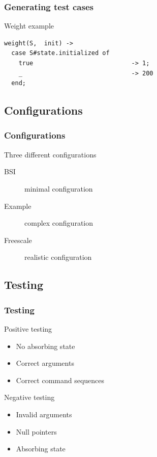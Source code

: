 \documentclass{beamer}
\begin{document}
\begin{frame}[fragile]
  \frametitle{Generating test cases}
  \begin{block}{Weight example}
    \Fontvi
    \begin{lstlisting}[style=erlang]
weight(S,  init) ->
  case S#state.initialized of
    true                           -> 1;
    _                              -> 200
  end;
    \end{lstlisting}
  \end{block}
\end{frame}

\subsection{Configurations}

\begin{frame}
  \frametitle{Configurations}
  Three different configurations\\
  \begin{description}
    \item[BSI] minimal configuration
    \item[Example] complex configuration
    \item[Freescale] realistic configuration
  \end{description}
\end{frame}

\subsection{Testing}

\begin{frame}
  \frametitle{Testing}
  \begin{block}{Positive testing}
    \begin{itemize}
      \item No absorbing state
      \item Correct arguments
      \item Correct command sequences
    \end{itemize}
  \end{block}
  \begin{block}{Negative testing}
    \begin{itemize}
      \item Invalid arguments
      \item Null pointers
      \item Absorbing state
    \end{itemize}
  \end{block}
\end{frame}
\end{document}
